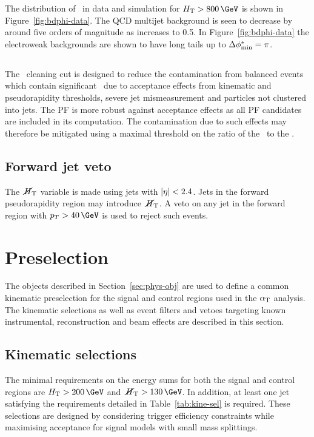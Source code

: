 The distribution of \bdphi~in data and simulation for $\scalht > 800\,\GeV$ is shown in Figure~\ref{fig:bdphi-data}.
The QCD multijet background is seen to decrease by around five orders of magnitude as \bdphi increases
to 0.5. In Figure~\ref{fig:bdphi-data} the electroweak backgrounds are
shown to have long tails up to $\mbox{$\Delta\phi^{*}_{\rm min}$} = \pi$.

\subsection{\mhtmet}
\label{sec:mhtmet}
The \mhtmet~cleaning cut is designed to reduce the contamination from balanced events
which contain significant \mht~due to acceptance effects from kinematic and 
pseudorapidity thresholds, severe jet mismeasurement and particles not 
clustered into jets. The PF \met is more robust against acceptance effects as all PF candidates are
included in its computation. The contamination due to such effects may therefore be mitigated 
using a maximal threshold on the ratio of the \mht~to the \met.

\subsection{Forward jet veto}
\label{sec:fwd_jet_veto}
The $\mbox{$\,\cancel{H}_{\rm T}$}$ variable is made using jets with $|\eta| < 2.4$. Jets in the forward pseudorapidity 
region may introduce $\mbox{$\,\cancel{H}_{\rm T}$}$. A veto on any jet in the forward region with $p_T > 40\,\GeV$
is used to reject such events. 

\section{Preselection}
\label{sec:presel}
The objects described in Section~\ref{sec:phys-obj} are used to define a common kinematic 
preselection for the signal and control regions used in the $\alpha_{\text{T}}$ analysis. 
The kinematic selections as well as event filters and vetoes targeting
known instrumental, reconstruction and beam effects are described in this section.

\subsection{Kinematic selections}
The minimal requirements on the energy sums for both the signal and control regions are
$\scalht > 200\,\GeV$ and $\mht > 130\,\GeV$. In addition, at least one jet satisfying the 
requirements detailed in Table~\ref{tab:kine-sel} is required. These selections are 
designed by considering trigger efficiency constraints while maximising acceptance for
signal models with small mass splittings.

